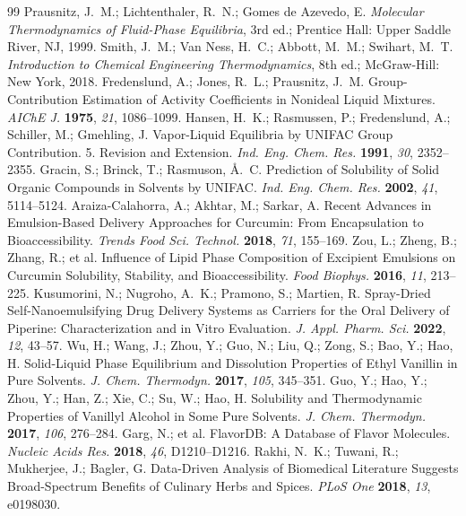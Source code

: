 \documentclass[journal=jceaax,manuscript=article,layout=twocolumn]{achemso}
\begin{document}
\begin{thebibliography}{99}
 Prausnitz, J.~M.; Lichtenthaler, R.~N.; Gomes de Azevedo, E. \textit{Molecular Thermodynamics of Fluid-Phase Equilibria}, 3rd ed.; Prentice Hall: Upper Saddle River, NJ, 1999.
 Smith, J.~M.; Van Ness, H.~C.; Abbott, M.~M.; Swihart, M.~T. \textit{Introduction to Chemical Engineering Thermodynamics}, 8th ed.; McGraw-Hill: New York, 2018.
 Fredenslund, A.; Jones, R.~L.; Prausnitz, J.~M. Group-Contribution Estimation of Activity Coefficients in Nonideal Liquid Mixtures. \textit{AIChE J.} \textbf{1975}, \textit{21}, 1086--1099.
 Hansen, H.~K.; Rasmussen, P.; Fredenslund, A.; Schiller, M.; Gmehling, J. Vapor-Liquid Equilibria by UNIFAC Group Contribution. 5. Revision and Extension. \textit{Ind. Eng. Chem. Res.} \textbf{1991}, \textit{30}, 2352--2355.
 Gracin, S.; Brinck, T.; Rasmuson, \AA.~C. Prediction of Solubility of Solid Organic Compounds in Solvents by UNIFAC. \textit{Ind. Eng. Chem. Res.} \textbf{2002}, \textit{41}, 5114--5124.
 Araiza-Calahorra, A.; Akhtar, M.; Sarkar, A. Recent Advances in Emulsion-Based Delivery Approaches for Curcumin: From Encapsulation to Bioaccessibility. \textit{Trends Food Sci. Technol.} \textbf{2018}, \textit{71}, 155--169.
 Zou, L.; Zheng, B.; Zhang, R.; et al. Influence of Lipid Phase Composition of Excipient Emulsions on Curcumin Solubility, Stability, and Bioaccessibility. \textit{Food Biophys.} \textbf{2016}, \textit{11}, 213--225.
 Kusumorini, N.; Nugroho, A.~K.; Pramono, S.; Martien, R. Spray-Dried Self-Nanoemulsifying Drug Delivery Systems as Carriers for the Oral Delivery of Piperine: Characterization and in Vitro Evaluation. \textit{J. Appl. Pharm. Sci.} \textbf{2022}, \textit{12}, 43--57.
 Wu, H.; Wang, J.; Zhou, Y.; Guo, N.; Liu, Q.; Zong, S.; Bao, Y.; Hao, H. Solid-Liquid Phase Equilibrium and Dissolution Properties of Ethyl Vanillin in Pure Solvents. \textit{J. Chem. Thermodyn.} \textbf{2017}, \textit{105}, 345--351.
 Guo, Y.; Hao, Y.; Zhou, Y.; Han, Z.; Xie, C.; Su, W.; Hao, H. Solubility and Thermodynamic Properties of Vanillyl Alcohol in Some Pure Solvents. \textit{J. Chem. Thermodyn.} \textbf{2017}, \textit{106}, 276--284.
 Garg, N.; et al. FlavorDB: A Database of Flavor Molecules. \textit{Nucleic Acids Res.} \textbf{2018}, \textit{46}, D1210--D1216.
 Rakhi, N.~K.; Tuwani, R.; Mukherjee, J.; Bagler, G. Data-Driven Analysis of Biomedical Literature Suggests Broad-Spectrum Benefits of Culinary Herbs and Spices. \textit{PLoS One} \textbf{2018}, \textit{13}, e0198030.

\end{thebibliography}
\end{document}
